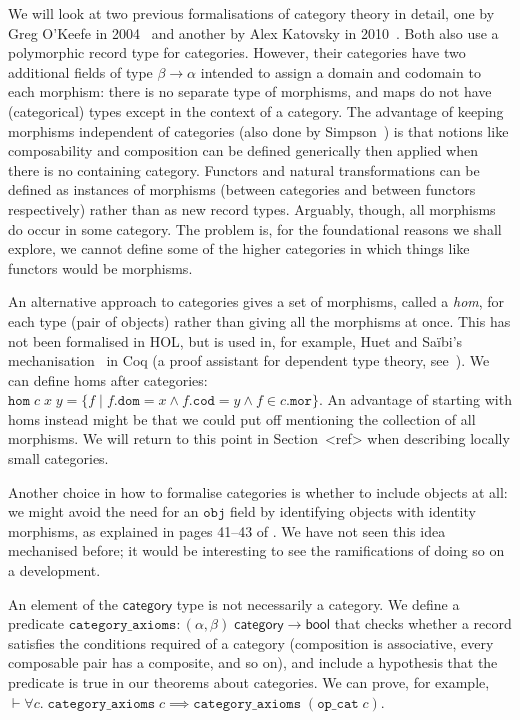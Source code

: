 \documentclass[twoside,titlepage,11pt]{article}
\begin{document}
We will look at two previous formalisations of category theory in detail, one by Greg O'Keefe in 2004~\cite{DBLP:journals/entcs/OKeefe04} and another by Alex Katovsky in 2010~\cite{Katovsky}.
Both also use a polymorphic record type for categories.
However, their categories have two additional fields of type $\beta\to\alpha$ intended to assign a domain and codomain to each morphism: there is no separate type of morphisms, and maps do not have (categorical) types except in the context of a category.
The advantage of keeping morphisms independent of categories (also done by Simpson~\cite{Simpson04}) is that notions like composability and composition can be defined generically then applied when there is no containing category.
Functors and natural transformations can be defined as instances of morphisms (between categories and between functors respectively) rather than as new record types.
Arguably, though, all morphisms do occur in some category.
The problem is, for the foundational reasons we shall explore, we cannot define some of the higher categories in which things like functors would be morphisms.

An alternative approach to categories gives a set of morphisms, called a \emph{hom}, for each type (pair of objects) rather than giving all the morphisms at once.
This has not been formalised in HOL, but is used in, for example, Huet and Sa{\"i}bi's mechanisation~\cite{DBLP:conf/birthday/HuetS00} in Coq (a proof assistant for dependent type theory, see~\cite{DBLP:conf/tphol/Bertot08}).
We can define homs after categories: $\mathtt{hom}\;c\;x\;y=\{f\mid f.\mathtt{dom}=x\land f.\mathtt{cod}=y\land f\in c.\mathtt{mor}\}$.
An advantage of starting with homs instead might be that we could put off mentioning the collection of all morphisms.
We will return to this point in Section~<ref> when describing locally small categories.

Another choice in how to formalise categories is whether to include objects at all: we might avoid the need for an $\mathtt{obj}$ field by identifying objects with identity morphisms, as explained in pages 41--43 of \cite{DBLP:books/daglib/0023249}.
We have not seen this idea mechanised before; it would be interesting to see the ramifications of doing so on a development.

An element of the $\mathsf{category}$ type is not necessarily a category.
We define a predicate $\mathtt{category\_axioms}:(\alpha,\beta)\;\mathsf{category}\to\mathsf{bool}$ that checks whether a record satisfies the conditions required of a category (composition is associative, every composable pair has a composite, and so on), and include a hypothesis that the predicate is true in our theorems about categories.
We can prove, for example, $\vdash\forall{c}.\;\mathtt{category\_axioms}\;c\implies\mathtt{category\_axioms}\;(\mathtt{op\_cat}\;c)$.
\end{document}

